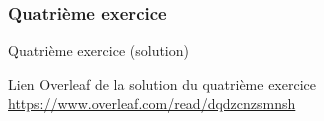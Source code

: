 \begin{frame}[fragile]
  \frametitle{Quatrième exercice}
  \begin{center}
  \end{center}
\end{frame}

\begin{frame}[fragile]{Quatrième exercice (solution)}
  \begin{center}
  Lien Overleaf de la solution du quatrième exercice \url{https://www.overleaf.com/read/dqdzcnzsmnsh}
  \end{center}
\end{frame}

